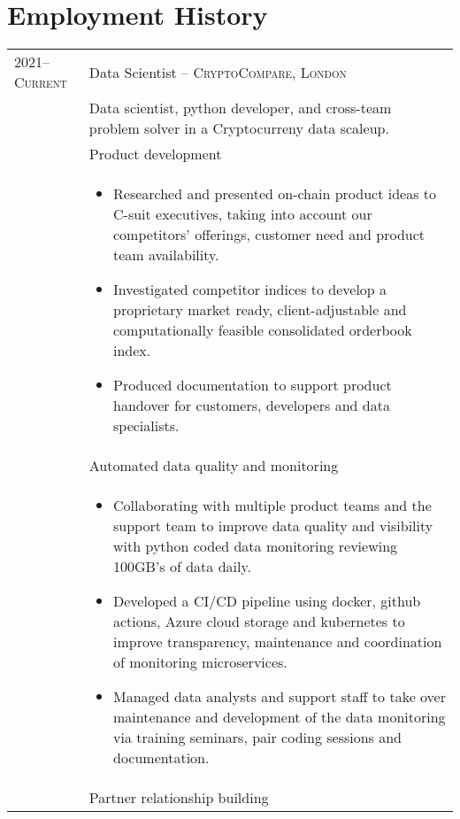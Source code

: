 \documentclass[a4paper,10pt]{article}
\newcommand{\tab}{\hspace{10 pt}}
\begin{document}
\section{Employment History}
\begin{tabular}{p{2.25cm}|p{15cm}}
%
%	
	\textsc{2021--Current} & \large{Data Scientist -- \textsc{CryptoCompare, London}}\\
	 & Data scientist, python developer, and cross-team problem solver in a Cryptocurreny data scaleup.\vspace{0.05 in}\\
	 & \tab \large{Product development}\\
	 & \vspace{-0.07 in}\begin{itemize}
	 		\item Researched and presented on-chain product ideas to C-suit executives, taking into account our competitors' offerings, customer need and product team availability. 
	 		\item Investigated competitor indices to develop a proprietary market ready, client-adjustable and computationally feasible consolidated orderbook index.
	 		\item Produced documentation to support product handover for customers, developers and data specialists. 
	 	\end{itemize}\vspace{-0.15 in}\\
	 & \tab \large{Automated data quality and monitoring}\\
	 & \vspace{-0.07 in}\begin{itemize}
		\item Collaborating with multiple product teams and the support team to improve data quality and visibility with python coded data monitoring reviewing 100GB’s of data daily. 
		\item Developed a CI/CD pipeline using docker, github actions, Azure cloud storage and kubernetes to improve transparency, maintenance and coordination of monitoring microservices.
		\item Managed data analysts and support staff to take over maintenance and development of the data monitoring via training seminars, pair coding sessions and documentation.
	\end{itemize}\vspace{-0.15 in}\\ 
	 & \tab \large{Partner relationship building}\\

\end{tabular}
\end{document}
